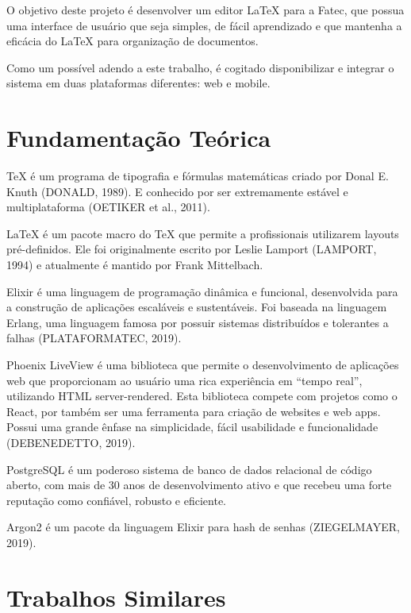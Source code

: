 \documentclass[article,12pt,oneside,a4paper,english,brazil,sumario=tradicional]{abntex2}
\begin{document}
O objetivo deste projeto é desenvolver um editor LaTeX para a Fatec, que possua uma interface de usuário que seja simples, de fácil aprendizado e que mantenha a eficácia do LaTeX para organização de documentos.

Como um possível adendo a este trabalho, é cogitado disponibilizar e integrar o sistema em duas plataformas diferentes: web e mobile.





\section{Fundamentação Teórica}

TeX é um programa de tipografia e fórmulas matemáticas criado por Donal E. Knuth (DONALD, 1989). E conhecido por ser extremamente estável e multiplataforma (OETIKER et al., 2011).

LaTeX é um pacote macro do TeX que permite a profissionais utilizarem layouts pré-definidos. Ele foi originalmente escrito por Leslie Lamport (LAMPORT, 1994) e atualmente é mantido por Frank Mittelbach.

Elixir é uma linguagem de programação dinâmica e funcional, desenvolvida para a construção de aplicações escaláveis e sustentáveis. Foi baseada na linguagem Erlang, uma linguagem famosa por possuir sistemas distribuídos e tolerantes a falhas (PLATAFORMATEC, 2019).

Phoenix LiveView é uma biblioteca que permite o desenvolvimento de aplicações web que proporcionam ao usuário uma rica experiência em “tempo real”, utilizando HTML server-rendered. Esta biblioteca compete com projetos como o React, por também ser uma ferramenta para criação de websites e web apps. Possui uma grande ênfase na simplicidade, fácil usabilidade e funcionalidade (DEBENEDETTO, 2019).

PostgreSQL é um poderoso sistema de banco de dados relacional de código aberto, com mais de 30 anos de desenvolvimento ativo e que recebeu uma forte reputação como confiável, robusto e eficiente.

Argon2 é um pacote da linguagem Elixir para hash de senhas (ZIEGELMAYER, 2019).





\section{Trabalhos Similares}
\end{document}

